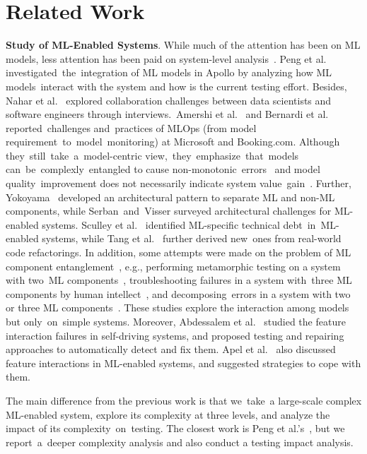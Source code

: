 
\section{Related Work}
\vspace{-3pt}

\textbf{Study of ML-Enabled Systems}. While much of the attention has been on ML models, less attention has been paid on system-level analysis~\cite{Christian2022}. Peng et al.~\cite{pengFirstLookIntegration2020} investigated~the~integration of ML models in Apollo by analyzing how ML models~interact with the system and how is the current testing effort. Besides, Nahar et al.~\cite{Nahar2022} explored collaboration challenges between data scientists and software engineers through interviews.~Amershi et al.~\cite{Amershi2019} and Bernardi et al.~\cite{Bernardi2019} reported~challenges and~practices of MLOps (from model requirement~to~model~monitoring) at Microsoft and Booking.com. Although they~still~take~a~model-centric view,~they~emphasize~that~models can~be~complexly~entangled to cause non-monotonic~errors~\cite{Amershi2019} and model quality~improvement does not necessarily indicate system value~gain~\cite{Bernardi2019}. Further, Yokoyama~\cite{Yokoyama2019} developed an architectural pattern to separate ML and non-ML components, while Serban~and~Visser \cite{Serban2022} surveyed architectural challenges for ML-enabled systems. Sculley et al.~\cite{hidden_technical_debt} identified ML-specific technical debt~in~ML-enabled systems, while Tang et al.~\cite{tang2021empirical} further derived new~ones from real-world code refactorings. In addition, some attempts were made on the problem of ML component entanglement~\cite{Amershi2019}, e.g., performing metamorphic testing on a system with two~ML components~\cite{Zhang2016}, troubleshooting failures in a system with~three ML components by human intellect~\cite{nushi2017human}, and decomposing~errors in a system with two or three ML components~\cite{fix_that_fails}. These studies explore the interaction among models but only~on~simple systems. Moreover, Abdessalem et al.~\cite{Abdessalem2018, Abdessalem2020} studied the feature interaction failures in self-driving systems, and proposed testing and repairing approaches to automatically detect and fix them. Apel et al.~\cite{feature_interaction} also discussed feature interactions in ML-enabled systems, and suggested strategies to cope with them.

The main difference from the previous work is that we~take~a large-scale complex ML-enabled system, explore its complexity at three levels, and analyze the impact of its complexity~on~testing. The closest work is Peng et al.'s~\cite{pengFirstLookIntegration2020}, but we report~a~deeper complexity analysis and also conduct a testing impact analysis.

